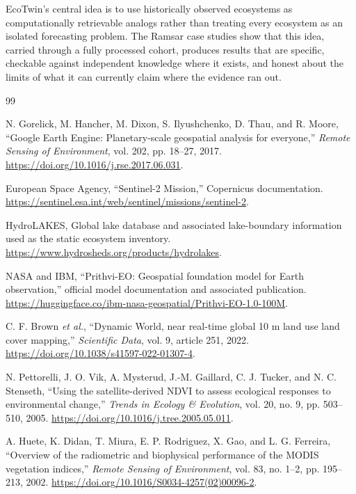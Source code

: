 \documentclass[12pt,a4paper,oneside]{report}
\begin{document}
EcoTwin's central idea is to use historically observed ecosystems as
computationally retrievable analogs rather than treating every
ecosystem as an isolated forecasting problem. The Ramsar case
studies show that this idea, carried through a fully processed
cohort, produces results that are specific, checkable against
independent knowledge where it exists, and honest about the limits
of what it can currently claim where the evidence ran out.


\begin{thebibliography}{99}

N. Gorelick, M. Hancher, M. Dixon, S. Ilyushchenko, D. Thau, and
R. Moore, ``Google Earth Engine: Planetary-scale geospatial analysis
for everyone,'' \textit{Remote Sensing of Environment}, vol. 202,
pp. 18--27, 2017. \url{https://doi.org/10.1016/j.rse.2017.06.031}.

European Space Agency, ``Sentinel-2 Mission,'' Copernicus
documentation. \url{https://sentinel.esa.int/web/sentinel/missions/sentinel-2}.

HydroLAKES, Global lake database and associated lake-boundary
information used as the static ecosystem inventory.
\url{https://www.hydrosheds.org/products/hydrolakes}.

NASA and IBM, ``Prithvi-EO: Geospatial foundation model for Earth
observation,'' official model documentation and associated
publication. \url{https://huggingface.co/ibm-nasa-geospatial/Prithvi-EO-1.0-100M}.

C. F. Brown \textit{et al.}, ``Dynamic World, near real-time global
10 m land use land cover mapping,'' \textit{Scientific Data},
vol. 9, article 251, 2022.
\url{https://doi.org/10.1038/s41597-022-01307-4}.

N. Pettorelli, J. O. Vik, A. Mysterud, J.-M. Gaillard, C. J. Tucker,
and N. C. Stenseth, ``Using the satellite-derived NDVI to assess
ecological responses to environmental change,'' \textit{Trends in
Ecology \& Evolution}, vol. 20, no. 9, pp. 503--510, 2005.
\url{https://doi.org/10.1016/j.tree.2005.05.011}.

A. Huete, K. Didan, T. Miura, E. P. Rodriguez, X. Gao, and
L. G. Ferreira, ``Overview of the radiometric and biophysical
performance of the MODIS vegetation indices,'' \textit{Remote
Sensing of Environment}, vol. 83, no. 1--2, pp. 195--213, 2002.
\url{https://doi.org/10.1016/S0034-4257(02)00096-2}.


\end{thebibliography}
\end{document}
